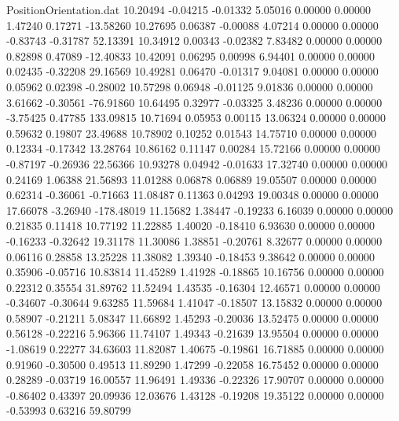 \begin{filecontents}{PositionOrientation.dat}
  10.20494   -0.04215   -0.01332     5.05016    0.00000    0.00000    1.47240    0.17271  -13.58260
  10.27695    0.06387   -0.00088     4.07214    0.00000    0.00000   -0.83743   -0.31787   52.13391
  10.34912    0.00343   -0.02382     7.83482    0.00000    0.00000    0.82898    0.47089  -12.40833
  10.42091    0.06295    0.00998     6.94401    0.00000    0.00000    0.02435   -0.32208   29.16569
  10.49281    0.06470   -0.01317     9.04081    0.00000    0.00000    0.05962    0.02398   -0.28002
  10.57298    0.06948   -0.01125     9.01836    0.00000    0.00000    3.61662   -0.30561  -76.91860
  10.64495    0.32977   -0.03325     3.48236    0.00000    0.00000   -3.75425    0.47785  133.09815
  10.71694    0.05953    0.00115    13.06324    0.00000    0.00000    0.59632    0.19807   23.49688
  10.78902    0.10252    0.01543    14.75710    0.00000    0.00000    0.12334   -0.17342   13.28764
  10.86162    0.11147    0.00284    15.72166    0.00000    0.00000   -0.87197   -0.26936   22.56366
  10.93278    0.04942   -0.01633    17.32740    0.00000    0.00000    0.24169    1.06388   21.56893
  11.01288    0.06878    0.06889    19.05507    0.00000    0.00000    0.62314   -0.36061   -0.71663
  11.08487    0.11363    0.04293    19.00348    0.00000    0.00000   17.66078   -3.26940 -178.48019
  11.15682    1.38447   -0.19233     6.16039    0.00000    0.00000    0.21835    0.11418   10.77192
  11.22885    1.40020   -0.18410     6.93630    0.00000    0.00000   -0.16233   -0.32642   19.31178
  11.30086    1.38851   -0.20761     8.32677    0.00000    0.00000    0.06116    0.28858   13.25228
  11.38082    1.39340   -0.18453     9.38642    0.00000    0.00000    0.35906   -0.05716   10.83814
  11.45289    1.41928   -0.18865    10.16756    0.00000    0.00000    0.22312    0.35554   31.89762
  11.52494    1.43535   -0.16304    12.46571    0.00000    0.00000   -0.34607   -0.30644    9.63285
  11.59684    1.41047   -0.18507    13.15832    0.00000    0.00000    0.58907   -0.21211    5.08347
  11.66892    1.45293   -0.20036    13.52475    0.00000    0.00000    0.56128   -0.22216    5.96366
  11.74107    1.49343   -0.21639    13.95504    0.00000    0.00000   -1.08619    0.22277   34.63603
  11.82087    1.40675   -0.19861    16.71885    0.00000    0.00000    0.91960   -0.30500    0.49513
  11.89290    1.47299   -0.22058    16.75452    0.00000    0.00000    0.28289   -0.03719   16.00557
  11.96491    1.49336   -0.22326    17.90707    0.00000    0.00000   -0.86402    0.43397   20.09936
  12.03676    1.43128   -0.19208    19.35122    0.00000    0.00000   -0.53993    0.63216   59.80799

\end{filecontents}
